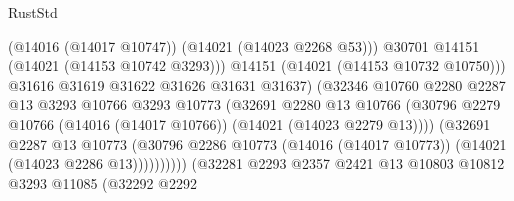 \begin{lexlean}{RustStd}
\begin{coremodule}
                                                (@14016 (@14017 @10747))
                                                (@14021 (@14023 @2268 @53)))
                                              @30701
                                              @14151
                                              (@14021 (@14153 @10742 @3293)))
                                            @14151
                                            (@14021 (@14153 @10732 @10750)))
                                          @31616
                                          @31619
                                          @31622
                                          @31626
                                          @31631
                                          @31637)
                                        (@32346
                                          @10760
                                          @2280
                                          @2287
                                          @13
                                          @3293
                                          @10766
                                          @3293
                                          @10773
                                          (@32691
                                            @2280
                                            @13
                                            @10766
                                            (@30796
                                              @2279
                                              @10766
                                              (@14016 (@14017 @10766))
                                              (@14021 (@14023 @2279 @13))))
                                          (@32691
                                            @2287
                                            @13
                                            @10773
                                            (@30796
                                              @2286
                                              @10773
                                              (@14016 (@14017 @10773))
                                              (@14021 (@14023 @2286 @13))))))))))
                              (@32281
                                @2293
                                @2357
                                @2421
                                @13
                                @10803
                                @10812
                                @3293
                                @11085
                                (@32292
                                  @2292

\end{coremodule}
\end{lexlean}
